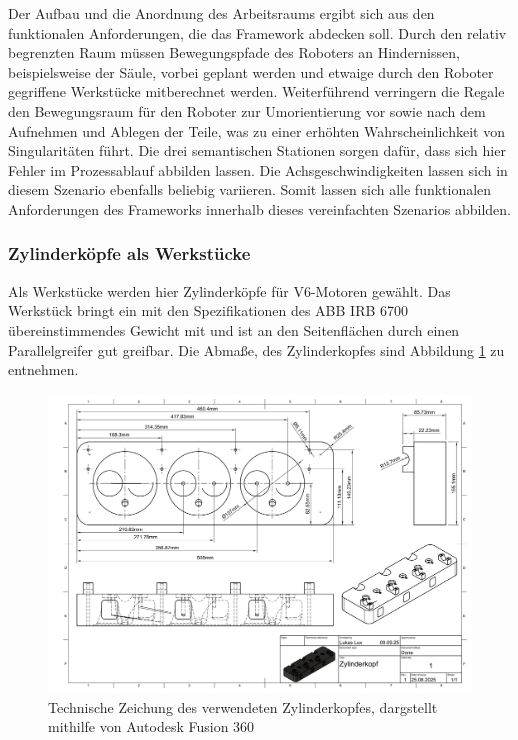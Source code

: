Der Aufbau und die Anordnung des Arbeitsraums ergibt sich aus den funktionalen
Anforderungen, die das Framework abdecken soll. Durch den relativ begrenzten
Raum müssen Bewegungspfade des Roboters an Hindernissen,
beispielsweise der Säule, vorbei
geplant werden und etwaige durch den Roboter gegriffene Werkstücke
mitberechnet werden. Weiterführend verringern die Regale den Bewegungsraum für
den Roboter zur Umorientierung vor sowie nach dem Aufnehmen und
Ablegen der Teile,
was zu einer erhöhten Wahrscheinlichkeit von Singularitäten führt. Die drei
semantischen Stationen sorgen dafür, dass sich hier Fehler im Prozessablauf
abbilden lassen. Die Achsgeschwindigkeiten lassen sich in diesem Szenario
ebenfalls beliebig variieren. Somit lassen sich alle funktionalen Anforderungen
des Frameworks innerhalb dieses vereinfachten Szenarios abbilden.

\subsubsection{Zylinderköpfe als Werkstücke}
Als Werkstücke werden hier Zylinderköpfe für V6-Motoren gewählt. Das Werkstück
bringt ein mit den Spezifikationen des ABB IRB 6700 übereinstimmendes Gewicht
mit und ist an den Seitenflächen durch einen Parallelgreifer gut greifbar. Die
Abmaße, des Zylinderkopfes sind Abbildung \ref{figure:cylinderhead}
zu entnehmen.

\begin{figure}[H]
  \centering
  \includegraphics[width=\linewidth]{Figures/CyclinderHead-1.png}
  \caption{Technische Zeichung des verwendeten Zylinderkopfes, dargstellt
  mithilfe von Autodesk Fusion 360}
  \label{figure:cylinderhead}
\end{figure}

